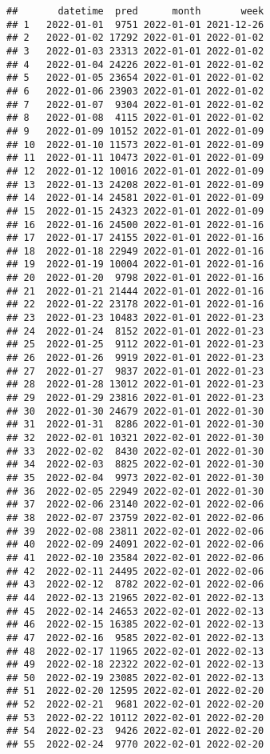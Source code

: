 \documentclass[
]{article}
\begin{document}
\begin{verbatim}
##       datetime  pred      month       week
## 1   2022-01-01  9751 2022-01-01 2021-12-26
## 2   2022-01-02 17292 2022-01-01 2022-01-02
## 3   2022-01-03 23313 2022-01-01 2022-01-02
## 4   2022-01-04 24226 2022-01-01 2022-01-02
## 5   2022-01-05 23654 2022-01-01 2022-01-02
## 6   2022-01-06 23903 2022-01-01 2022-01-02
## 7   2022-01-07  9304 2022-01-01 2022-01-02
## 8   2022-01-08  4115 2022-01-01 2022-01-02
## 9   2022-01-09 10152 2022-01-01 2022-01-09
## 10  2022-01-10 11573 2022-01-01 2022-01-09
## 11  2022-01-11 10473 2022-01-01 2022-01-09
## 12  2022-01-12 10016 2022-01-01 2022-01-09
## 13  2022-01-13 24208 2022-01-01 2022-01-09
## 14  2022-01-14 24581 2022-01-01 2022-01-09
## 15  2022-01-15 24323 2022-01-01 2022-01-09
## 16  2022-01-16 24500 2022-01-01 2022-01-16
## 17  2022-01-17 24155 2022-01-01 2022-01-16
## 18  2022-01-18 22949 2022-01-01 2022-01-16
## 19  2022-01-19 10004 2022-01-01 2022-01-16
## 20  2022-01-20  9798 2022-01-01 2022-01-16
## 21  2022-01-21 21444 2022-01-01 2022-01-16
## 22  2022-01-22 23178 2022-01-01 2022-01-16
## 23  2022-01-23 10483 2022-01-01 2022-01-23
## 24  2022-01-24  8152 2022-01-01 2022-01-23
## 25  2022-01-25  9112 2022-01-01 2022-01-23
## 26  2022-01-26  9919 2022-01-01 2022-01-23
## 27  2022-01-27  9837 2022-01-01 2022-01-23
## 28  2022-01-28 13012 2022-01-01 2022-01-23
## 29  2022-01-29 23816 2022-01-01 2022-01-23
## 30  2022-01-30 24679 2022-01-01 2022-01-30
## 31  2022-01-31  8286 2022-01-01 2022-01-30
## 32  2022-02-01 10321 2022-02-01 2022-01-30
## 33  2022-02-02  8430 2022-02-01 2022-01-30
## 34  2022-02-03  8825 2022-02-01 2022-01-30
## 35  2022-02-04  9973 2022-02-01 2022-01-30
## 36  2022-02-05 22949 2022-02-01 2022-01-30
## 37  2022-02-06 23140 2022-02-01 2022-02-06
## 38  2022-02-07 23759 2022-02-01 2022-02-06
## 39  2022-02-08 23811 2022-02-01 2022-02-06
## 40  2022-02-09 24091 2022-02-01 2022-02-06
## 41  2022-02-10 23584 2022-02-01 2022-02-06
## 42  2022-02-11 24495 2022-02-01 2022-02-06
## 43  2022-02-12  8782 2022-02-01 2022-02-06
## 44  2022-02-13 21965 2022-02-01 2022-02-13
## 45  2022-02-14 24653 2022-02-01 2022-02-13
## 46  2022-02-15 16385 2022-02-01 2022-02-13
## 47  2022-02-16  9585 2022-02-01 2022-02-13
## 48  2022-02-17 11965 2022-02-01 2022-02-13
## 49  2022-02-18 22322 2022-02-01 2022-02-13
## 50  2022-02-19 23085 2022-02-01 2022-02-13
## 51  2022-02-20 12595 2022-02-01 2022-02-20
## 52  2022-02-21  9681 2022-02-01 2022-02-20
## 53  2022-02-22 10112 2022-02-01 2022-02-20
## 54  2022-02-23  9426 2022-02-01 2022-02-20
## 55  2022-02-24  9770 2022-02-01 2022-02-20

\end{verbatim}
\end{document}
